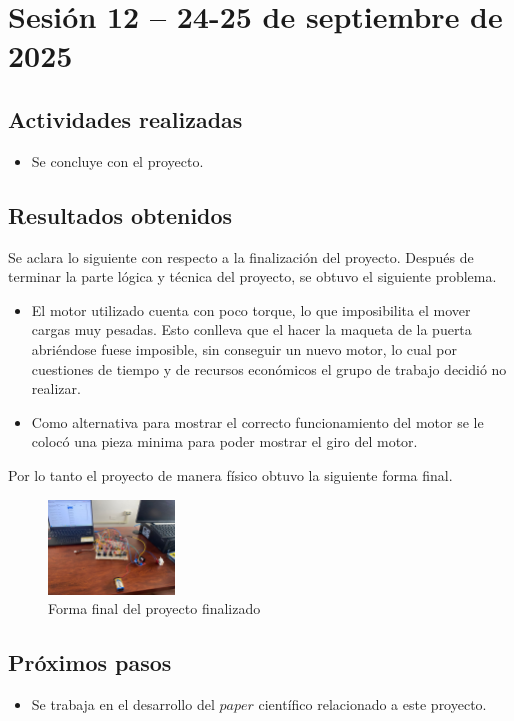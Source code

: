 \documentclass[12pt,letterpaper]{article}
\begin{document}
\section{Sesión 12 -- 24-25 de septiembre de 2025}
\subsection*{Actividades realizadas}
\begin{itemize}
    \item Se concluye con el proyecto.
\end{itemize}

\subsection*{Resultados obtenidos}
Se aclara lo siguiente con respecto a la finalización del proyecto. Después de terminar la parte lógica y técnica del proyecto, se obtuvo el siguiente problema. 
\begin{itemize}
    \item El motor utilizado cuenta con poco torque, lo que imposibilita el mover cargas muy pesadas. Esto conlleva que el hacer la maqueta de la puerta abriéndose fuese imposible, sin conseguir un nuevo motor, lo cual por cuestiones de tiempo y de recursos económicos el grupo de trabajo decidió no realizar.
    \item Como alternativa para mostrar el correcto funcionamiento del motor se le colocó una pieza minima para poder mostrar el giro del motor.
\end{itemize}
Por lo tanto el proyecto de manera físico obtuvo la siguiente forma final.
\begin{figure}[H]
    \centering
    \includegraphics[width=0.3\textwidth]{images/final_pp.jpg} %
    \caption{Forma final del proyecto finalizado}
    \label{fig:CONCLU}
\end{figure}

\subsection*{Próximos pasos}
\begin{itemize}
    \item Se trabaja en el desarrollo del $paper$ científico relacionado a este proyecto.
\end{itemize}
\end{document}
